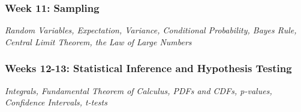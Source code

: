 \documentclass[11pt, letterpaper]{article}
\begin{document}
\subsubsection*{Week 11: Sampling}
\textit{Random Variables, Expectation, Variance, Conditional Probability, Bayes Rule, Central Limit Theorem, the Law of Large Numbers}

\subsubsection*{Weeks 12-13: Statistical Inference and Hypothesis Testing}
\textit{Integrals, Fundamental Theorem of Calculus, PDFs and CDFs, p-values, Confidence Intervals, t-tests}



%

%
%
\end{document}
